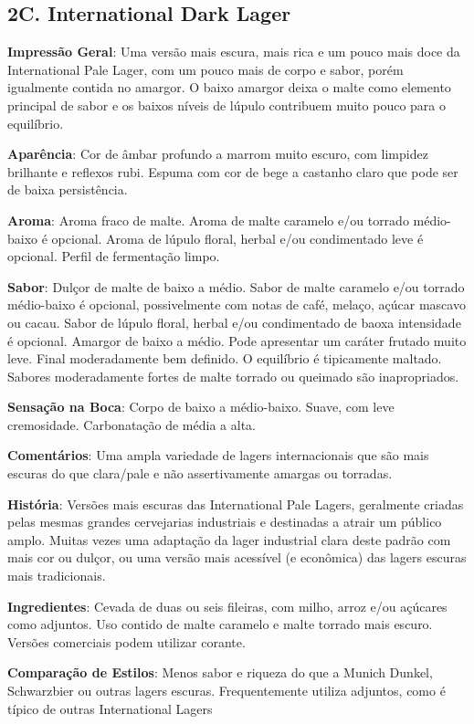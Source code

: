 \subsection*{2C. International Dark Lager}
\textbf{Impressão Geral}: Uma versão mais escura, mais rica e um pouco mais doce da International Pale Lager, com um pouco mais de corpo e sabor, porém igualmente contida no amargor. O baixo amargor deixa o malte como elemento principal de sabor e os baixos níveis de lúpulo contribuem muito pouco para o equilíbrio.

\textbf{Aparência}: Cor de âmbar profundo a marrom muito escuro, com limpidez brilhante e reflexos rubi. Espuma com cor de bege a castanho claro que pode ser de baixa persistência.

\textbf{Aroma}: Aroma fraco de malte. Aroma de malte caramelo e/ou torrado médio-baixo é opcional. Aroma de lúpulo floral, herbal e/ou condimentado leve é opcional. Perfil de fermentação limpo.

\textbf{Sabor}: Dulçor de malte de baixo a médio. Sabor de malte caramelo e/ou torrado médio-baixo é opcional, possivelmente com notas de café, melaço, açúcar mascavo ou cacau. Sabor de lúpulo floral, herbal e/ou condimentado de baoxa intensidade é opcional. Amargor de baixo a médio. Pode apresentar um caráter frutado muito leve. Final moderadamente bem definido. O equilíbrio é tipicamente maltado. Sabores moderadamente fortes de malte torrado ou queimado são inapropriados.

\textbf{Sensação na Boca}: Corpo de baixo a médio-baixo. Suave, com leve cremosidade. Carbonatação de média a alta.

\textbf{Comentários}: Uma ampla variedade de lagers internacionais que são mais escuras do que clara/pale e não assertivamente amargas ou torradas.

\textbf{História}: Versões mais escuras das International Pale Lagers, geralmente criadas pelas mesmas grandes cervejarias industriais e destinadas a atrair um público amplo. Muitas vezes uma adaptação da lager industrial clara deste padrão com mais cor ou dulçor, ou uma versão mais acessível (e econômica) das lagers escuras mais tradicionais.

\textbf{Ingredientes}: Cevada de duas ou seis fileiras, com milho, arroz e/ou açúcares como adjuntos. Uso contido de malte caramelo e malte torrado mais escuro. Versões comerciais podem utilizar corante.

\textbf{Comparação de Estilos}: Menos sabor e riqueza do que a Munich Dunkel, Schwarzbier ou outras lagers escuras. Frequentemente utiliza adjuntos, como é típico de outras International Lagers

